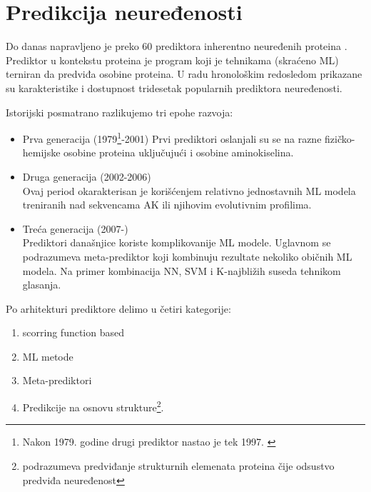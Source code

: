\section{Predikcija neuređenosti}

Do danas napravljeno je preko 60 prediktora inherentno neuređenih proteina
\parencite{Meng2017}. Prediktor u kontekstu proteina je program koji je
tehnikama  (skraćeno ML) terniran da predviđa osobine
proteina.  U radu \parencite{Meng_c2017} hronološkim redosledom prikazane su
karakteristike i dostupnost tridesetak popularnih prediktora neuređenosti.


Istorijski posmatrano razlikujemo tri epohe razvoja: \parencite{Meng_c2017}
\begin{itemize}
  \item Prva generacija (1979\footnote{
      Nakon 1979. godine drugi prediktor nastao je tek 1997.
      \parencite{Meng_c2017} }-2001)
    Prvi prediktori oslanjali su se na razne fizičko-hemijske osobine proteina
    uključujući i osobine aminokiselina. 

  \item Druga generacija (2002-2006)\\
    Ovaj period okarakterisan je korišćenjem relativno jednostavnih ML modela
    treniranih nad sekvencama AK ili njihovim evolutivnim profilima.

  \item Treća generacija (2007-)\\
    Prediktori današnjice koriste komplikovanije ML modele. Uglavnom  se
    podrazumeva meta-prediktor koji kombinuju rezultate nekoliko običnih ML
    modela. Na primer kombinacija NN, SVM i K-najbližih suseda tehnikom
    glasanja.

\end{itemize}


Po arhitekturi prediktore delimo u četiri kategorije: \parencite{Meng_c2017}
\begin{enumerate}
  \item
    scorring function based

  \item
    ML metode 

  \item
    Meta-prediktori

  \item
    Predikcije na osnovu strukture\footnote{podrazumeva predviđanje strukturnih
    elemenata proteina čije odsustvo predviđa neuređenost}.
\end{enumerate}



